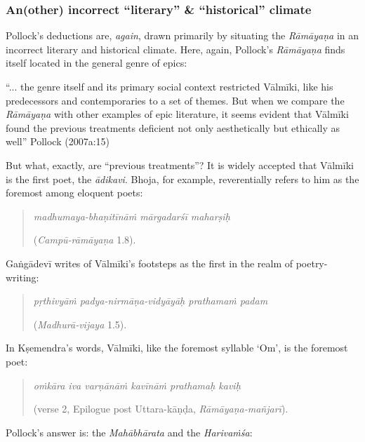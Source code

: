 \subsubsection{An(other) incorrect “literary” \& “historical” climate}\label{sec1.2.3.1}

Pollock’s deductions are, {\sl again}, drawn primarily by situating the {\sl Rāmāyaṇa} in an incorrect literary and historical climate. Here, again, Pollock’s {\sl Rāmāyaṇa} finds itself located in the general genre of epics:

\begin{myquote}
“... the genre itself and its primary social context restricted Vālmīki, like his predecessors and contemporaries to a set of themes. But when we compare the {\sl Rāmāyaṇa} with other examples of epic literature, it seems evident that Vālmīki found the previous treatments deficient not only aesthetically but ethically as well”
\hfill Pollock (2007a:15)
\end{myquote}

But what, exactly, are “previous treatments”? It is widely accepted that Vālmīki is the first poet, the {\sl ādikavi}. Bhoja, for example, reverentially refers to him as the foremost among eloquent poets:

\begin{quote}
{\sl madhumaya-bhaṇitīnāṁ mārgadarśī maharṣiḥ} 

\hfill ({\sl Campū-rāmāyaṇa} 1.8). 
\end{quote}

Gaṅgādevī writes of Vālmīki’s footsteps as the first in the realm of poetry-writing:   

\begin{quote}
{\sl pṛthivyāṁ padya-nirmāṇa-vidyāyāḥ prathamaṁ padam} 

\hfill ({\sl Madhurā-vijaya} 1.5). 
\end{quote}

In Kṣemendra’s words, Vālmīki, like the foremost syllable ‘Om’, is the foremost poet:

\begin{quote}
{\sl oṁkāra iva varṇānāṁ kavīnāṁ prathamaḥ kaviḥ}

\hfill (verse 2, Epilogue post Uttara-kāṇḍa, {\sl Rāmāyaṇa-mañjarī}).
\end{quote}

\newpage

Pollock’s answer is: the {\sl Mahābhārata} and the {\sl Harivaṁśa}:

